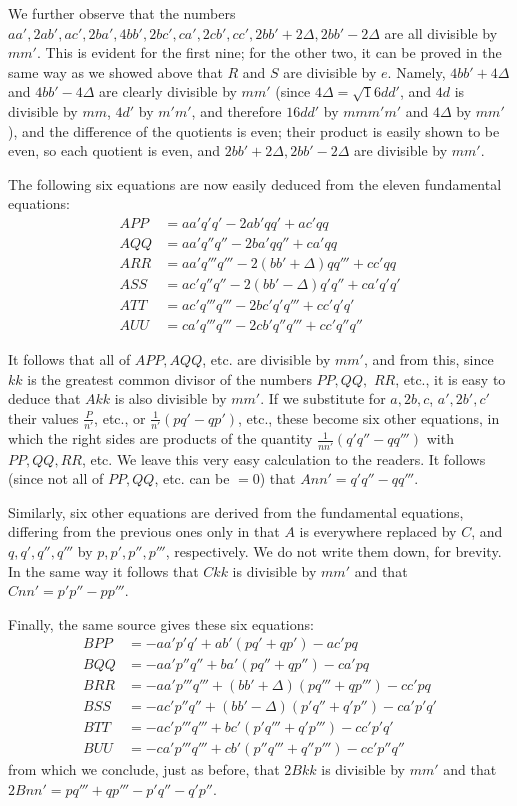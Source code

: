 We further observe that the numbers $aa',2ab',ac',2ba',4bb',2bc',ca',2cb',cc',2bb'+2\Delta,2bb'-2\Delta$ are all divisible by $mm'$. This is evident for the first nine; for the other two, it can be proved in the same way as we showed above that $R$ and $S$ are divisible by $e$. Namely, $4bb'+4\Delta$ and $4bb'-4\Delta$ are clearly divisible by $mm'$ (since $4\Delta=\surd16dd'$, and $4d$ is divisible by $mm$, $4d'$ by $m'm'$, and therefore $16dd'$ by $mmm'm'$ and $4\Delta$ by $mm'$), and the difference of the quotients is even; their product is easily shown to be even, so each quotient is even, and $2bb'+2\Delta,2bb'-2\Delta$ are divisible by $mm'$.

The following six equations are now easily deduced from the eleven fundamental equations:
\[
\begin{aligned}
APP&=aa'q'q'-2ab'qq'+ac'qq\\
AQQ&=aa'q''q''-2ba'qq''+ca'qq\\
ARR&=aa'q'''q'''-2(bb'+\Delta)qq'''+cc'qq\\
ASS&=ac'q''q''-2(bb'-\Delta)q'q''+ca'q'q'\\
ATT&=ac'q'''q'''-2bc'q'q'''+cc'q'q'\\
AUU&=ca'q'''q'''-2cb'q''q'''+cc'q''q''
\end{aligned}
\]

It follows that all of $APP,AQQ$, etc. are divisible by $mm'$, and from this, since $kk$ is the greatest common divisor of the numbers $PP,QQ,$
$RR$, etc., it is easy to deduce that $Akk$ is also divisible by $mm'$. If we substitute for $a,2b,c$, $a',2b',c'$ their values $\frac{P}{n'}$, etc., or $\frac{1}{n'}(pq'-qp')$, etc., these become six other equations, in which the right sides are products of the quantity $\frac{1}{nn'}(q'q''-qq''')$ with $PP,QQ,RR$, etc. We leave this very easy calculation to the readers. It follows (since not all of $PP,QQ$, etc. can be $=0$) that $Ann'=q'q''-qq'''$.

Similarly, six other equations are derived from the fundamental equations, differing from the previous ones only in that $A$ is everywhere replaced by $C$, and $q,q',q'',q'''$ by $p,p',p'',p'''$, respectively. We do not write them down, for brevity. In the same way it follows that $Ckk$ is divisible by $mm'$ and that $Cnn'=p'p''-pp'''$.

Finally, the same source gives these six equations:
\[
\begin{aligned}
BPP&=-aa'p'q'+ab'(pq'+qp')-ac'pq\\
BQQ&=-aa'p''q''+ba'(pq''+qp'')-ca'pq\\
BRR&=-aa'p'''q'''+(bb'+\Delta)(pq'''+qp''')-cc'pq\\
BSS&=-ac'p''q''+(bb'-\Delta)(p'q''+q'p'')-ca'p'q'\\
BTT&=-ac'p'''q'''+bc'(p'q'''+q'p''')-cc'p'q'\\
BUU&=-ca'p'''q'''+cb'(p''q'''+q''p''')-cc'p''q''
\end{aligned}
\]
from which we conclude, just as before, that $2Bkk$ is divisible by $mm'$ and that $2Bnn'=pq'''+qp'''-p'q''-q'p''$.

